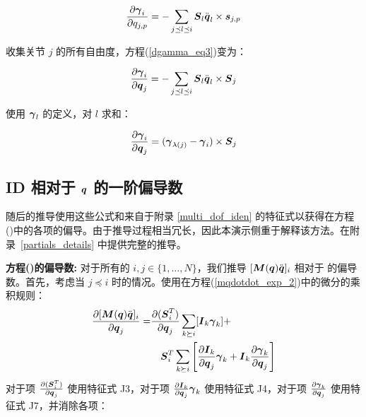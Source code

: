\documentclass[letterpaper, 10 pt, conference]{ieeetran}  %
\begin{document}
\begin{equation}
    \frac{\partial \gammabar_{i}}{\partial \qjp{j}{p}} = - \sum_{j \preceq l \preceq i} \Phibar_{l} \qdd_{l}  \times \phibar_{j,p}
\label{dgamma_eq3}
\end{equation}

\noindent 收集关节 $j$ 的所有自由度，方程(\ref{dgamma_eq3})变为：

\begin{equation}
    \frac{\partial \gammabar_{i}}{\partial \q_{j}} =  - \sum_{j \preceq l \preceq i} \Phibar_{l} \qdd_{l}  \times \Phibar_{j}
\label{dgamma_eq4}
\end{equation}

\noindent 使用 $\boldsymbol{\gamma}_{l}$ 的定义，对 $l$ 求和：

\begin{equation}
    \frac{\partial \gammabar_{i}}{\partial \q_{j}} = (\gammabar_{\lambda(j)} - \gammabar_{i}  )  \times \Phibar_{j}
\label{dgamma_eq5}
\end{equation}


\subsection{ID 相对于 $\boldsymbol{q}$ 的一阶偏导数}

\label{FO_ID_adsva_sec}

随后的推导使用这些公式和来自于附录 \ref{multi_dof_iden} 的特征式以获得在方程(\red{\ref{inv_dyn_expanded_eq2}})中的各项的偏导。由于推导过程相当冗长，因此本演示侧重于解释该方法。在附录~\ref{partials_details} 中提供完整的推导。

\vspace{1ex}
{\noindent \bf 方程(\red{\ref{mqdotdot_exp_2}})的偏导数:} 对于所有的 $ i,j \in \{1,\ldots,N\}$，我们推导 $[ \boldsymbol{M}(\boldsymbol{q}) \ddot{\boldsymbol{q}}]_{i}$ 相对于  的偏导数。首先，考虑当 $j \preceq i$ 时的情况。使用在方程(\ref{mqdotdot_exp_2})中的微分的乘积规则：
  \begin{equation}
      \begin{aligned}
        \frac{\partial [ \boldsymbol{M}(\boldsymbol{q})\ddot{\boldsymbol{q}}]_{i}}{\partial \boldsymbol{q}_{j}} = & \frac{\partial (\boldsymbol{S}_{i}^{T})}{\partial \boldsymbol{q}_{j}} \sum_{k \succeq i} [\boldsymbol{I}{}_{k} \boldsymbol{\gamma}_{k}]   +  \\ &~~~    \boldsymbol{S}_{i}^{T}  \sum_{k \succeq i} \Bigg[\frac{\partial \boldsymbol{I}{}_{k}}{\partial \boldsymbol{q}_{j}} \boldsymbol{\gamma}_{k} +  \boldsymbol{I}{}_{k} \frac{\partial \boldsymbol{\gamma}_{k}}{\partial \boldsymbol{q}_{j}} \Bigg]  
      \end{aligned}
\end{equation}
  对于项 $\frac{\partial (\boldsymbol{S}_{i}^{T})}{\partial \boldsymbol{q}_{j}}$ 使用特征式 J3，对于项 $\frac{\partial \boldsymbol{I}{}_{k}}{\partial \boldsymbol{q}_{j}} \boldsymbol{\gamma}_{k}$ 使用特征式 J4，对于项 $\frac{\partial \boldsymbol{\gamma}_{k}}{\partial \boldsymbol{q}_{j}}$ 使用特征式 J7，并消除各项：
  
\end{document}
